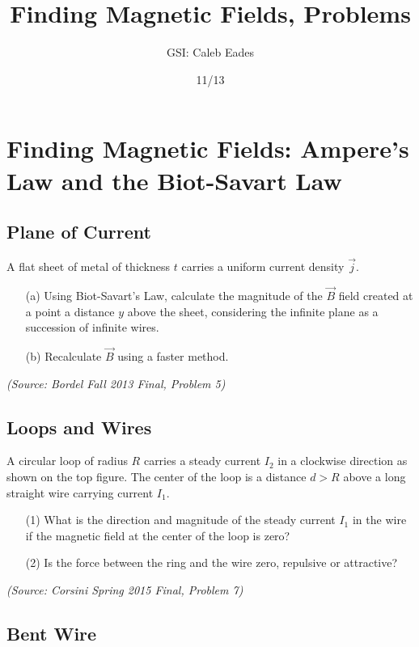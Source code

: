 \documentclass{article}
\begin{document}
\title{Finding Magnetic Fields, Problems}
\author{GSI: Caleb Eades}
\date{11/13}
\maketitle

\section{Finding Magnetic Fields: Ampere's Law and the Biot-Savart Law}

\subsection{Plane of Current}

A flat sheet of metal of thickness $t$ carries a uniform current density $\vec{j}$.
\begin{itemize}
\item[(a)] Using Biot-Savart's Law, calculate the magnitude of the $\vec{B}$ field created at a point a distance $y$ above the sheet, considering the infinite plane as a succession of infinite wires.
\item[(b)] Recalculate $\vec{B}$ using a faster method.
\end{itemize}

\textit{(Source: Bordel Fall 2013 Final, Problem 5)}

\subsection{Loops and Wires}

A circular loop of radius $R$ carries a steady current $I_2$ in a clockwise direction as shown on the top figure. The center of the loop is a distance $d>R$ above a long straight wire carrying current $I_1$.
\begin{itemize}
\item[(1)] What is the direction and magnitude of the steady current $I_1$ in the wire if the magnetic field at the center of the loop is zero?
\item[(2)] Is the force between the ring and the wire zero, repulsive or attractive?
\end{itemize}

\textit{(Source: Corsini Spring 2015 Final, Problem 7)}

\subsection{Bent Wire}
\end{document}
